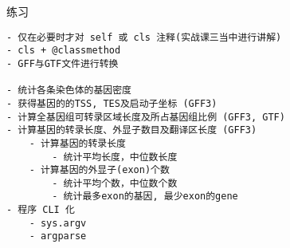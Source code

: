 \begin{frame}[fragile]{练习}
    \begin{lstlisting}
- 仅在必要时才对 self 或 cls 注释(实战课三当中进行讲解)
- cls + @classmethod
- GFF与GTF文件进行转换

- 统计各条染色体的基因密度
- 获得基因的的TSS, TES及启动子坐标 (GFF3)
- 计算全基因组可转录区域长度及所占基因组比例 (GFF3, GTF)
- 计算基因的转录长度、外显子数目及翻译区长度 (GFF3)
    - 计算基因的转录长度
        - 统计平均长度，中位数长度
    - 计算基因的外显子(exon)个数
        - 统计平均个数，中位数个数
        - 统计最多exon的基因, 最少exon的gene
- 程序 CLI 化
    - sys.argv
    - argparse
    \end{lstlisting}
\end{frame}